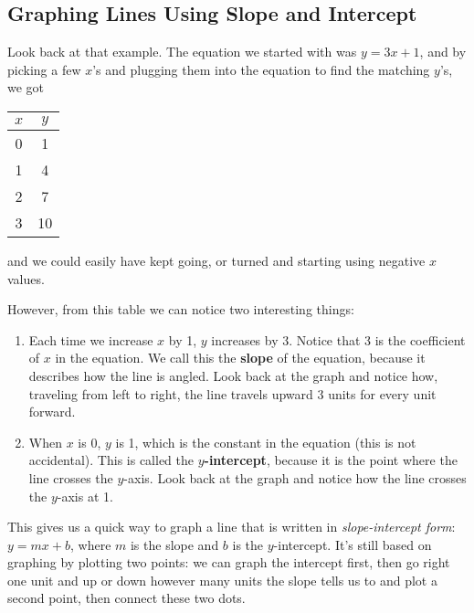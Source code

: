 \subsection{Graphing Lines Using Slope and Intercept}
Look back at that example.  The equation we started with was $y=3x+1$, and by picking a few $x$'s and plugging them into the equation to find the matching $y$'s, we got 
\begin{center}
\begin{tabular}{c c}
$x$ & $y$\\
\hline
0 & 1\\
1 & 4\\
2 & 7\\
3 & 10
\end{tabular}
\end{center}
and we could easily have kept going, or turned and starting using negative $x$ values.

However, from this table we can notice two interesting things:
\begin{enumerate}
\item Each time we increase $x$ by 1, $y$ increases by 3.  Notice that 3 is the coefficient of $x$ in the equation.  We call this the \textbf{slope} of the equation, because it describes how the line is angled.  Look back at the graph and notice how, traveling from left to right, the line travels upward 3 units for every unit forward.
\item When $x$ is 0, $y$ is 1, which is the constant in the equation (this is not accidental).  This is called the \textbf{$y$-intercept}, because it is the point where the line crosses the $y$-axis.  Look back at the graph and notice how the line crosses the $y$-axis at 1.
\end{enumerate}

This gives us a quick way to graph a line that is written in \textit{slope-intercept form}: $y=mx+b$, where $m$ is the slope and $b$ is the $y$-intercept.  It's still based on graphing by plotting two points: we can graph the intercept first, then go right one unit and up or down however many units the slope tells us to and plot a second point, then connect these two dots.
\vfill
\pagebreak

